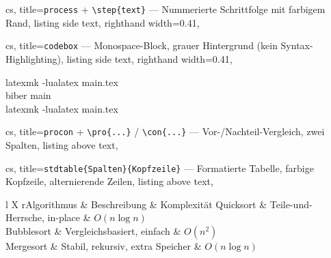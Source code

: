 \documentclass[a4paper, 11pt, ngerman]{article}
\begin{document}
\vspace{0.45em}

\begin{tcblisting}{cs,
  title={\texttt{process} + \texttt{\textbackslash step\{text\}} — Nummerierte Schrittfolge mit farbigem Rand},
  listing side text,
  righthand width=0.41\linewidth,
}
\begin{process}
\end{process}
\end{tcblisting}

\vspace{0.45em}

\begin{tcblisting}{cs,
  title={\texttt{codebox} — Monospace-Block, grauer Hintergrund (kein Syntax-Highlighting)},
  listing side text,
  righthand width=0.41\linewidth,
}
\begin{codebox}
latexmk -lualatex main.tex\\
biber main\\
latexmk -lualatex main.tex
\end{codebox}
\end{tcblisting}

\vspace{0.45em}

\begin{tcblisting}{cs,
  title={\texttt{procon} + \texttt{\textbackslash pro\{...\}} / \texttt{\textbackslash con\{...\}} — Vor-/Nachteil-Vergleich, zwei Spalten},
  listing above text,
}
\begin{procon}
\end{procon}
\end{tcblisting}

\vspace{0.45em}

\begin{tcblisting}{cs,
  title={\texttt{stdtable\{Spalten\}\{Kopfzeile\}} — Formatierte Tabelle, farbige Kopfzeile, alternierende Zeilen},
  listing above text,
}
\begin{stdtable}{l X r}{Algorithmus & Beschreibung & Komplexität}
  Quicksort  & Teile-und-Herrsche, in-place          & $O(n \log n)$ \\
  Bubblesort & Vergleichsbasiert, einfach             & $O(n^2)$      \\
  Mergesort  & Stabil, rekursiv, extra Speicher       & $O(n \log n)$ \\
\end{stdtable}
\end{tcblisting}
\end{document}
